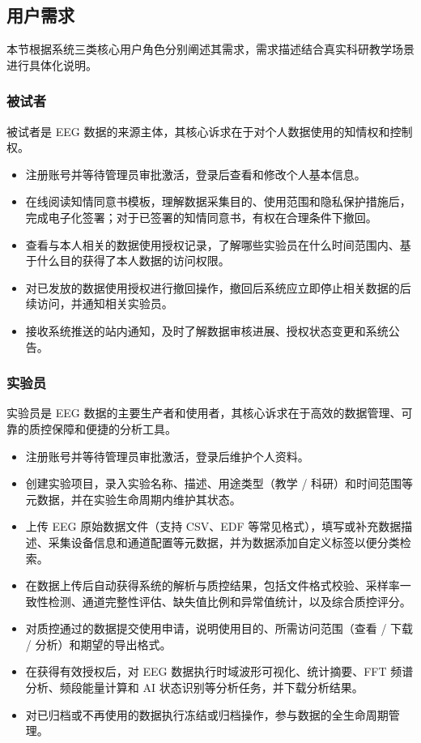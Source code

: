 \subsection{用户需求}

本节根据系统三类核心用户角色分别阐述其需求，需求描述结合真实科研教学场景进行具体化说明。

\subsubsection{被试者}

被试者是 EEG 数据的来源主体，其核心诉求在于对个人数据使用的知情权和控制权。

\begin{itemize}
  \item 注册账号并等待管理员审批激活，登录后查看和修改个人基本信息。
  \item 在线阅读知情同意书模板，理解数据采集目的、使用范围和隐私保护措施后，完成电子化签署；对于已签署的知情同意书，有权在合理条件下撤回。
  \item 查看与本人相关的数据使用授权记录，了解哪些实验员在什么时间范围内、基于什么目的获得了本人数据的访问权限。
  \item 对已发放的数据使用授权进行撤回操作，撤回后系统应立即停止相关数据的后续访问，并通知相关实验员。
  \item 接收系统推送的站内通知，及时了解数据审核进展、授权状态变更和系统公告。
\end{itemize}

\subsubsection{实验员}

实验员是 EEG 数据的主要生产者和使用者，其核心诉求在于高效的数据管理、可靠的质控保障和便捷的分析工具。

\begin{itemize}
  \item 注册账号并等待管理员审批激活，登录后维护个人资料。
  \item 创建实验项目，录入实验名称、描述、用途类型（教学 / 科研）和时间范围等元数据，并在实验生命周期内维护其状态。
  \item 上传 EEG 原始数据文件（支持 CSV、EDF 等常见格式），填写或补充数据描述、采集设备信息和通道配置等元数据，并为数据添加自定义标签以便分类检索。
  \item 在数据上传后自动获得系统的解析与质控结果，包括文件格式校验、采样率一致性检测、通道完整性评估、缺失值比例和异常值统计，以及综合质控评分。
  \item 对质控通过的数据提交使用申请，说明使用目的、所需访问范围（查看 / 下载 / 分析）和期望的导出格式。
  \item 在获得有效授权后，对 EEG 数据执行时域波形可视化、统计摘要、FFT 频谱分析、频段能量计算和 AI 状态识别等分析任务，并下载分析结果。
  \item 对已归档或不再使用的数据执行冻结或归档操作，参与数据的全生命周期管理。
\end{itemize}

